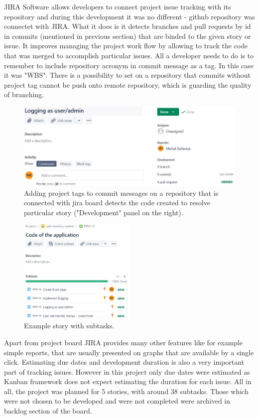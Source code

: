\documentclass[a4paper,12pt]{book}
\begin{document}
{JIRA Software allows developers to connect project issue tracking with its repository and during this development it was no different - github repository was connectet with JIRA. What it does is it detects branches and pull requests by id in commits (mentioned in previous section) that are binded to the given story or issue. It improves managing the project work flow by allowing to track the code that was merged to accomplish particular issues. All a developer needs to do is to remember to include repository acronym in commit message as a tag. In this case it was "WBS". There is a possibility to set on a repository that commits without project tag cannot be push onto remote repository, which is guarding the quality of branching.

\begin{figure}[H]
  \centering
    \includegraphics[width=1.0\textwidth]{issue}
    \caption{Adding project tags to commit messages on a repository that is connected with jira board detects the code created to resolve particular story ("Development" panel on the right).~\cite{jiraboard}}
\end{figure} 
    
\begin{figure}[H]
  \centering
    \includegraphics[width=0.5\textwidth]{applicationstory}
    \caption{Example story with subtasks.~\cite{jiraboard}}
\end{figure}
    
\bigskip
Apart from project board JIRA provides many other features like for example simple reports, that are usually presented on graphs that are available by a single click.      
Estimating due dates and development duration is also a very important part of tracking issues. However in this project only due dates were estimated  as Kanban framework does not expect estimating the duration for each issue. All in all, the project was planned for 5 stories, with around 38 subtasks. Those which were not chosen to be developed and were not completed were archived in backlog section of the board.

}
\end{document}
